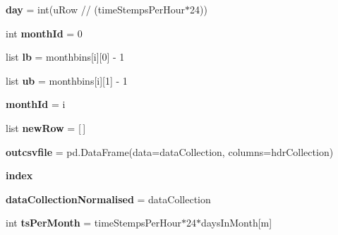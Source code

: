 \begin{DoxyCompactItemize}
\item 
\mbox{\label{class_f_plots_1_1_frm_plots_ae8bf5a756cf15252b4e514a258bbbde9}} 
{\bfseries day} = int(u\+Row // (time\+Stemps\+Per\+Hour$\ast$24))
\item 
\mbox{\label{class_f_plots_1_1_frm_plots_a7cdf7d9fbe8469505076cbd6b2a2f7bb}} 
int {\bfseries month\+Id} = 0
\item 
\mbox{\label{class_f_plots_1_1_frm_plots_ae1c2db7a3d9e5fed306cbb98a0d7fae6}} 
list {\bfseries lb} = monthbins\mbox{[}i\mbox{]}\mbox{[}0\mbox{]} -\/ 1
\item 
\mbox{\label{class_f_plots_1_1_frm_plots_a6eb3868d7a9c0bfc1f6b469b780be2cb}} 
list {\bfseries ub} = monthbins\mbox{[}i\mbox{]}\mbox{[}1\mbox{]} -\/ 1
\item 
\mbox{\label{class_f_plots_1_1_frm_plots_af5e295966cb3b55c25873f5c050e7697}} 
{\bfseries month\+Id} = i
\item 
\mbox{\label{class_f_plots_1_1_frm_plots_a1f15916248cf6fdeace227e97b91ad44}} 
list {\bfseries new\+Row} = \mbox{[}$\,$\mbox{]}
\item 
\mbox{\label{class_f_plots_1_1_frm_plots_a059b08e05ad66aa281c470e859179352}} 
{\bfseries outcsvfile} = pd.\+Data\+Frame(data=data\+Collection, columns=hdr\+Collection)
\item 
\mbox{\label{class_f_plots_1_1_frm_plots_a6784e1c334dfceb8f017667c0b0f6a3e}} 
{\bfseries index}
\item 
\mbox{\label{class_f_plots_1_1_frm_plots_a552466cc9784f110ea6326e03a33004d}} 
{\bfseries data\+Collection\+Normalised} = data\+Collection
\item 
\mbox{\label{class_f_plots_1_1_frm_plots_a4eaba10810b6dee02a994e775474f87f}} 
int {\bfseries ts\+Per\+Month} = time\+Stemps\+Per\+Hour$\ast$24$\ast$days\+In\+Month\mbox{[}m\mbox{]}
\item 

\end{DoxyCompactItemize}
